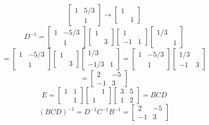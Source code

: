 \documentclass[openany]{book}
\begin{document}
\begin{itemize}
$$\begin{bmatrix}
1 & 5/3 \\
& 1
\end{bmatrix} \rightarrow \begin{bmatrix}
1 & \\
& 1
\end{bmatrix}$$
$$D^{-1} = \begin{bmatrix}
1 & -5/3 \\
& 1
\end{bmatrix}\begin{bmatrix}
1 & \\
& 3
\end{bmatrix}\begin{bmatrix}
1 & \\
-1 & 1
\end{bmatrix}\begin{bmatrix}
1/3 & \\
& 1
\end{bmatrix}$$
$$= \begin{bmatrix}
1 & -5/3 \\
& 1
\end{bmatrix}\begin{bmatrix}
1 & \\
& 3
\end{bmatrix}\begin{bmatrix}
1/3 & \\
-1/3 & 1
\end{bmatrix} = \begin{bmatrix}
1 & -5/3 \\
& 1
\end{bmatrix}\begin{bmatrix}
1/3 & \\
-1 & 3
\end{bmatrix}$$
$$= \begin{bmatrix}
2 & -5 \\
-1 & 3
\end{bmatrix}$$
$$E = \begin{bmatrix}
1 & 1 \\
& 1
\end{bmatrix}\begin{bmatrix}
& 1 \\
1 &
\end{bmatrix}\begin{bmatrix}
3 & 5 \\
1 & 2
\end{bmatrix} = BCD$$
$$(BCD)^{-1} = D^{-1}C^{-1}B^{-1} = \begin{bmatrix}
2 & -5 \\
-1 & 3

\end{bmatrix}$$
\end{itemize}
\end{document}
